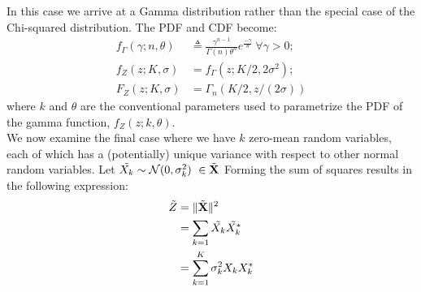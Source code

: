 In this case we arrive at a Gamma distribution rather than the special case of the Chi-squared distribution. The PDF and CDF become:
\begin{equation}\label{eq:gamma_scaled}
    \begin{aligned}
        f_\Gamma(\gamma; n,\theta) &\triangleq \frac{\gamma^{n-1}}{\Gamma(n)\theta^n}e^{\frac{-\gamma}{\theta}} \ \forall \gamma > 0;\\
        f_Z(z; K, \sigma) &= f_\Gamma(z;K/2,2\sigma^2);\\
        F_Z(z;K,\sigma) &= \Gamma_n(K/2,z/(2\sigma))
    \end{aligned}
\end{equation}
where $k$ and $\theta$ are the conventional parameters used to parametrize the PDF of the gamma function, $f_Z(z;k,\theta)$.\\

We  now examine the final case where we have $k$ zero-mean random variables, each of which has a (potentially) unique variance with respect to other normal random variables. Let $\Tilde{X_k}\sim\mathcal{N}(0,\sigma_k^2)\ \in \Tilde{\textbf{X}}$ Forming the sum of squares results in the following expression:
\begin{equation}\label{eq:gamma_sum_indep_scaled}
    \begin{aligned}
        \Tilde{Z} &= \Vert \Tilde{\textbf{X}} \Vert^2 \\
        &= \sum_{k = 1}\Tilde{X_k}\Tilde{X_k^*}\\
        &= \sum_{k = 1}^K \sigma_k^2X_kX_k^*
    \end{aligned}
\end{equation}

